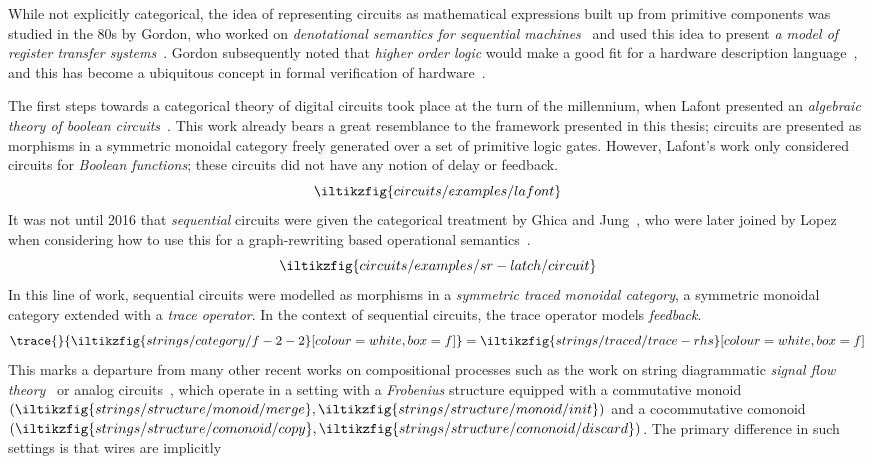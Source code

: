 While not explicitly categorical, the idea of representing circuits as
mathematical expressions built up from primitive components was studied in the
80s by Gordon, who worked on
\emph{denotational semantics for sequential machines}~\cite{gordon1980denotational}
and used this idea to present
\emph{a model of register transfer systems}~\cite{gordon1982model}.
Gordon subsequently noted that \emph{higher order logic} would make a good fit
for a hardware description language~\cite{gordon1985why}, and this has become
a ubiquitous concept in formal verification of hardware~\cite{gupta1992formal}.

The first steps towards a categorical theory of digital circuits took place at
the turn of the millennium, when Lafont presented an
\emph{algebraic theory of boolean circuits}~\cite{lafont2003algebraic}.
This work already bears a great resemblance to the framework presented in this
thesis; circuits
are presented as morphisms in a symmetric monoidal category freely generated
over a set of primitive logic gates.
However, Lafont's work only considered circuits for \emph{Boolean functions};
these circuits did not have any notion of delay or feedback.
\[
    \iltikzfig{circuits/examples/lafont}
\]
It was not until 2016 that \emph{sequential} circuits were given the
categorical treatment by Ghica and Jung~\cite{ghica2016categorical}, who were
later joined by Lopez when considering how to use this for a graph-rewriting
based operational semantics~\cite{ghica2017diagrammatic}.
\[
    \iltikzfig{circuits/examples/sr-latch/circuit}
\]
In this line of work, sequential circuits were modelled as morphisms in a
\emph{symmetric traced monoidal category}, a symmetric monoidal category
extended with a \emph{trace operator}.
In the context of sequential circuits, the trace operator models
\emph{feedback}.
\[
    \trace{}{
        \iltikzfig{strings/category/f-2-2}[colour=white,box=f]
    }
    =
    \iltikzfig{strings/traced/trace-rhs}[colour=white,box=f]
\]
This marks a departure from many other recent works on compositional processes
such as the work on string diagrammatic
\emph{signal flow theory}~\cite{bonchi2021survey} or analog
circuits~\cite{boisseau2022string}, which operate in a setting with a
\emph{Frobenius} structure equipped with a commutative monoid \((
\iltikzfig{strings/structure/monoid/merge},
\iltikzfig{strings/structure/monoid/init}
)\) and a cocommutative comonoid \((
\iltikzfig{strings/structure/comonoid/copy},
\iltikzfig{strings/structure/comonoid/discard}
)\).
The primary difference in such settings is that wires are implicitly
